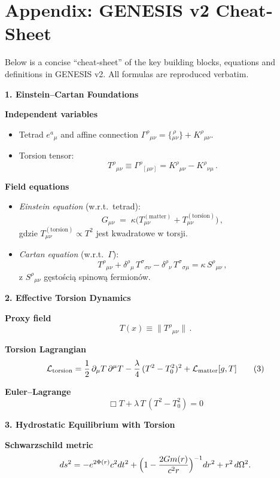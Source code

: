 \section*{Appendix: GENESIS v2 Cheat‐Sheet}
Below is a concise “cheat‐sheet” of the key building blocks, equations and definitions in GENESIS v2.  All formulas are reproduced verbatim.

\bigskip
\noindent\textbf{1. Einstein–Cartan Foundations}

\medskip
\noindent\textbf{Independent variables}
\begin{itemize}
  \item Tetrad $e^a{}_\mu$ and affine connection 
  $\displaystyle \Gamma^\rho{}_{\mu\nu} 
      = \bigl\{\!^{\,\rho}_{\mu\nu}\bigr\} 
      + K^\rho{}_{\mu\nu}$.
  \item Torsion tensor:
  \[
    T^\rho{}_{\mu\nu} \equiv \Gamma^\rho{}_{[\mu\nu]}
    = K^\rho{}_{\mu\nu} - K^\rho{}_{\nu\mu}\,.
  \]
\end{itemize}

\medskip
\noindent\textbf{Field equations}
\begin{itemize}
  \item \emph{Einstein equation} (w.r.t.\ tetrad):
  \[
    G_{\mu\nu}
    \;=\;\kappa\bigl(T^{(\mathrm{matter})}_{\mu\nu}
    +T^{(\mathrm{torsion})}_{\mu\nu}\bigr)\,,
  \]
  gdzie $T^{(\mathrm{torsion})}_{\mu\nu}\propto T^2$ jest kwadratowe w torsji.
  \item \emph{Cartan equation} (w.r.t.\ $\Gamma$):
  \[
    T^\rho{}_{\mu\nu}
    +\delta^\rho{}_\mu\,T^\sigma{}_{\sigma\nu}
    -\delta^\rho{}_\nu\,T^\sigma{}_{\sigma\mu}
    = \kappa\,S^\rho{}_{\mu\nu}\,,
  \]
  z $S^\rho{}_{\mu\nu}$ gęstością spinową fermionów.
\end{itemize}

\bigskip
\noindent\textbf{2. Effective Torsion Dynamics}

\medskip
\noindent\textbf{Proxy field} 
\[
  T(x)\equiv\|T^\rho{}_{\mu\nu}\|\,.
\]

\medskip
\noindent\textbf{Torsion Lagrangian}
\[
  \mathcal{L}_{\rm torsion}
  = \frac12\,\partial_\mu T\,\partial^\mu T
    - \frac\lambda4\,(T^2 - T_0^2)^2
    + \mathcal{L}_{\rm matter}[g,T]
    \tag{3}
\]

\medskip
\noindent\textbf{Euler–Lagrange}
\[
  \Box T + \lambda\,T\,(T^2 - T_0^2) = 0
  \tag{4}
\]

\bigskip
\noindent\textbf{3. Hydrostatic Equilibrium with Torsion}

\medskip
\noindent\textbf{Schwarzschild metric}
\[
  ds^2
  = -e^{2\Phi(r)}c^2dt^2
    + \Bigl(1-\frac{2Gm(r)}{c^2r}\Bigr)^{-1}dr^2
    + r^2\,d\Omega^2.
\]

